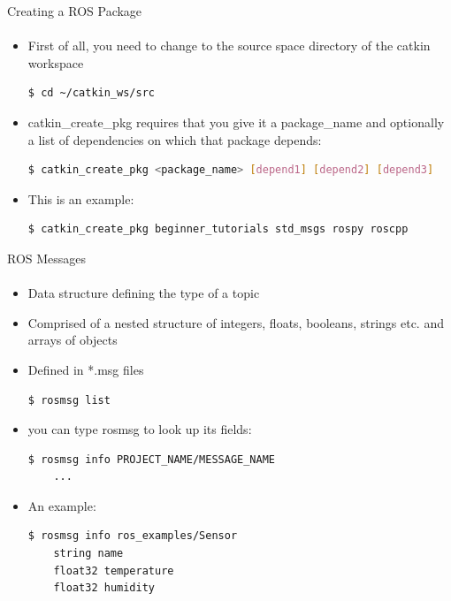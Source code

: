 \documentclass[aspectratio=169]{beamer}
\begin{document}
\begin{frame}[fragile]{Creating a ROS Package}
	\framesubtitle{ }
    \begin{itemize}
        \item First of all, you need to change to the source space directory of the catkin workspace
		\begin{lstlisting}[language=bash]
	$ cd ~/catkin_ws/src
		\end{lstlisting}
		\item catkin\_create\_pkg requires that you give it a package\_name and optionally a list of dependencies on which that package depends:
		\begin{lstlisting}[language=bash]
	$ catkin_create_pkg <package_name> [depend1] [depend2] [depend3]
		\end{lstlisting}
		\item This is an example:
		\begin{lstlisting}[language=bash]
			$ catkin_create_pkg beginner_tutorials std_msgs rospy roscpp
		\end{lstlisting}

	\end{itemize}
\end{frame}

\begin{frame}[fragile]{ROS Messages}
	\framesubtitle{ }
	\begin{minipage}{0.6\textwidth}
    \begin{itemize}
        \item Data structure defining the type of a topic
		\item Comprised of a nested structure of integers, floats, booleans, strings etc. and arrays of objects
		\item Defined in *.msg files
		\begin{lstlisting}[language=bash]
	$ rosmsg list
		\end{lstlisting}
		\item you can type rosmsg to look up its fields:
		\begin{lstlisting}[language=bash]
	$ rosmsg info PROJECT_NAME/MESSAGE_NAME
	...
		\end{lstlisting}

		\item An example:
		\begin{lstlisting}[language=bash]
	$ rosmsg info ros_examples/Sensor 
	string name
	float32 temperature
	float32 humidity	
		\end{lstlisting}

    \end{itemize}

\end{minipage}
\begin{minipage}{0.4\textwidth}
	
\end{minipage}
\end{frame}
\end{document}

